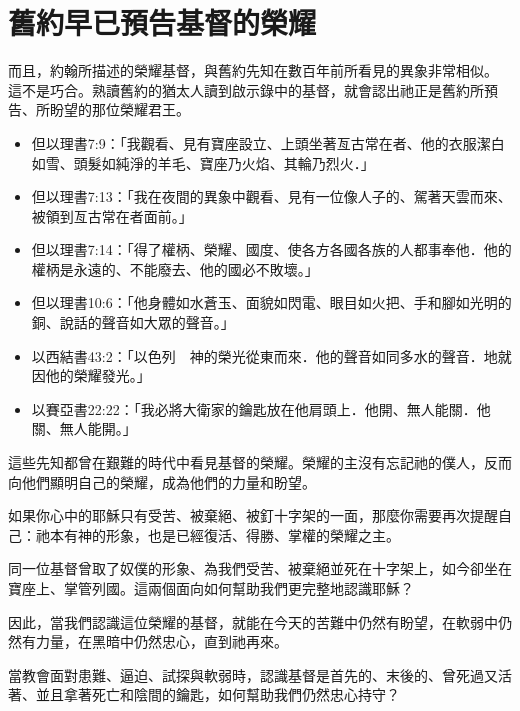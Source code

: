 \section{舊約早已預告基督的榮耀}
\label{sec:ch01_ot}

而且，約翰所描述的榮耀基督，與舊約先知在數百年前所看見的異象非常相似。
這不是巧合。熟讀舊約的猶太人讀到啟示錄中的基督，就會認出祂正是舊約所預告、所盼望的那位榮耀君王。
\begin{itemize}
\item 但以理書7:9：「我觀看、見有寶座設立、上頭坐著亙古常在者、他的衣服潔白如雪、頭髮如純淨的羊毛、寶座乃火焰、其輪乃烈火．」
\item 但以理書7:13：「我在夜間的異象中觀看、見有一位像人子的、駕著天雲而來、被領到亙古常在者面前。」
\item 但以理書7:14：「得了權柄、榮耀、國度、使各方各國各族的人都事奉他．他的權柄是永遠的、不能廢去、他的國必不敗壞。」
\item 但以理書10:6：「他身體如水蒼玉、面貌如閃電、眼目如火把、手和腳如光明的銅、說話的聲音如大眾的聲音。」
\item 以西結書43:2：「以色列　神的榮光從東而來．他的聲音如同多水的聲音．地就因他的榮耀發光。」
\item 以賽亞書22:22：「我必將大衛家的鑰匙放在他肩頭上．他開、無人能關．他關、無人能開。」
\end{itemize}
這些先知都曾在艱難的時代中看見基督的榮耀。榮耀的主沒有忘記祂的僕人，反而向他們顯明自己的榮耀，成為他們的力量和盼望。

如果你心中的耶穌只有受苦、被棄絕、被釘十字架的一面，那麼你需要再次提醒自己：祂本有神的形象，也是已經復活、得勝、掌權的榮耀之主。

\begin{ReaderQuestion}
同一位基督曾取了奴僕的形象、為我們受苦、被棄絕並死在十字架上，如今卻坐在寶座上、掌管列國。這兩個面向如何幫助我們更完整地認識耶穌？
\end{ReaderQuestion}

因此，當我們認識這位榮耀的基督，就能在今天的苦難中仍然有盼望，在軟弱中仍然有力量，在黑暗中仍然忠心，直到祂再來。

\begin{ReaderQuestion}
當教會面對患難、逼迫、試探與軟弱時，認識基督是首先的、末後的、曾死過又活著、並且拿著死亡和陰間的鑰匙，如何幫助我們仍然忠心持守？
\end{ReaderQuestion}
